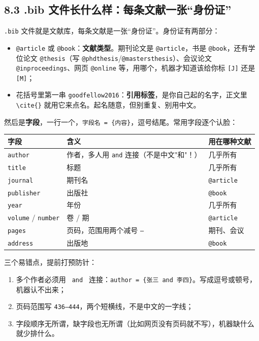 \subsection*{8.3 .bib 文件长什么样：每条文献一张“身份证”}

\texttt{.bib} 文件就是文献库，每条文献是一张“身份证”。身份证有两部分：

\begin{itemize}
\setlength{\itemsep}{2pt}
\item \texttt{@article} 或 \texttt{@book}：\textbf{文献类型}。期刊论文是 \texttt{@article}，书是 \texttt{@book}，还有学位论文 \texttt{@thesis}（写 \texttt{@phdthesis}/\texttt{@mastersthesis}）、会议论文 \texttt{@inproceedings}、网页 \texttt{@online} 等，用哪个，机器才知道该给你标 \texttt{[J]} 还是 \texttt{[M]}；
\item 花括号里第一串 \texttt{goodfellow2016}：\textbf{引用标签}，是你自己起的名字，正文里 \texttt{\textbackslash{}cite\{\}} 就用它来点名。起名随意，但别重复、别用中文。
\end{itemize}

然后是\textbf{字段}，一行一个，\texttt{字段名 = \{内容\}}，逗号结尾。常用字段逐个认脸：

\begin{table}[htbp]
\centering
\small
\begin{tabularx}{\linewidth}{@{}*{3}{>{\raggedright\arraybackslash}X}@{}}
\toprule
\textbf{字段} & \textbf{含义} & \textbf{用在哪种文献} \\
\midrule
\texttt{author} & 作者，多人用 \texttt{and} 连接（不是中文"和"！） & 几乎所有 \\
\texttt{title} & 标题 & 几乎所有 \\
\texttt{journal} & 期刊名 & \texttt{@article} \\
\texttt{publisher} & 出版社 & \texttt{@book} \\
\texttt{year} & 年份 & 几乎所有 \\
\texttt{volume} / \texttt{number} & 卷 / 期 & \texttt{@article} \\
\texttt{pages} & 页码，范围用两个减号 \texttt{--} & 期刊、会议 \\
\texttt{address} & 出版地 & \texttt{@book} \\
\bottomrule
\end{tabularx}
\end{table}

三个易错点，提前打预防针：

\begin{enumerate}
\setlength{\itemsep}{2pt}
\item 多个作者必须用 \texttt{ and } 连接：\texttt{author = \{张三 and 李四\}}。写成逗号或顿号，机器认不出来；
\item 页码范围写 \texttt{436--444}，两个短横线，不是中文的一字线；
\item 字段顺序无所谓，缺字段也无所谓（比如网页没有页码就不写），机器缺什么就少排什么。
\end{enumerate}

